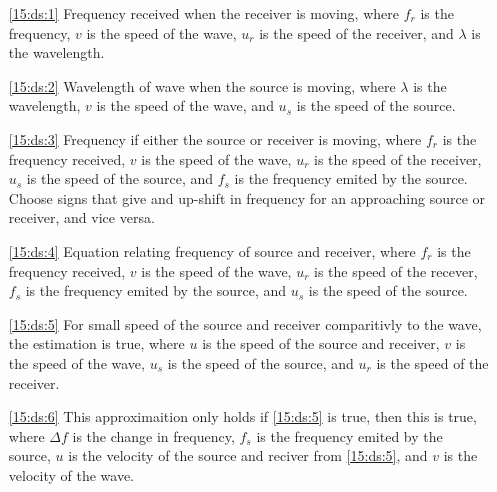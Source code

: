 \documentclass{subfile}
\begin{document}
\begin{enumerate}
	\item[\eqref{15:ds:1}] Frequency received when the receiver is moving, where $f_{r}$ is the frequency, $v$ is the speed of the wave, $u_{r}$ is the speed of the receiver, and $\lambda$ is the wavelength.
	\item[\eqref{15:ds:2}] Wavelength of wave when the source is moving, where $\lambda$ is the wavelength, $v$ is the speed of the wave, and $u_{s}$ is the speed of the source.
	\item[\eqref{15:ds:3}] Frequency if either the source or receiver is moving, where $f_{r}$ is the frequency received, $v$ is the speed of the wave, $u_{r}$ is the speed of the receiver, $u_{s}$ is the speed of the source, and $f_{s}$ is the frequency emited by the source. Choose signs that give and up-shift in frequency for an approaching source or receiver, and vice versa. 
	\item[\eqref{15:ds:4}] Equation relating frequency of source and receiver, where $f_{r}$ is the frequency received, $v$ is the speed of the wave, $u_{r}$ is the speed of the recever, $f_{s}$ is the frequency emited by the source, and $u_{s}$ is the speed of the source.
	\item[\eqref{15:ds:5}] For small speed of the source and receiver comparitivly to the wave, the estimation is true, where $u$ is the speed of the source and receiver, $v$ is the speed of the wave, $u_{s}$ is the speed of the source, and $u_{r}$ is the speed of the receiver.
	\item[\eqref{15:ds:6}] This approximaition only holds if \eqref{15:ds:5} is true, then this is true, where $\Delta f$ is the change in frequency, $f_{s}$ is the frequency emited by the source, $u$ is the velocity of the source and reciver from \eqref{15:ds:5}, and $v$ is the velocity of the wave.
\end{enumerate}
\end{document}
